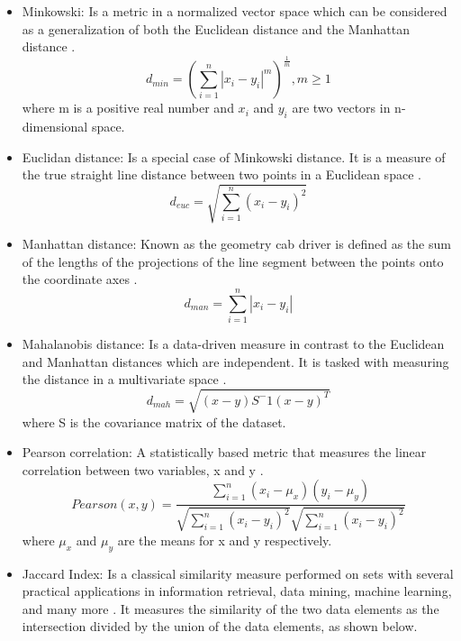 \begin{itemize}
  \item Minkowski: Is a metric in a normalized vector space which can be considered as a generalization of both the Euclidean distance and the Manhattan distance \citep{b56}.
    \begin{equation}
        d_{min} = (\sum_{i=1}^{n}|x_i - y_i|^m)^\frac{1}{m}, m\geq 1
    \end{equation}
    where m is a positive real number and $x_i$ and $y_i$ are two vectors in n-dimensional space.
    \item Euclidan distance: Is a special case of Minkowski distance. It is a measure of the true straight line distance between two points in a Euclidean space \citep{b19}.
    \begin{equation}
        d_{euc} =  \sqrt{\sum_{i=1}^{n}(x_{i}-y_{i})^2}
    \end{equation}
     \item Manhattan distance: Known as the geometry cab driver is defined as the
sum of the lengths of the projections of the line segment between the points onto the coordinate axes \citep{b58}.
     \begin{equation}
        d_{man} =  \sum_{i=1}^{n}|x_{i}-y_{i}|
    \end{equation}
    \item Mahalanobis distance: Is a data-driven measure in contrast to the Euclidean and Manhattan distances which are independent. It is tasked with measuring the distance in a multivariate space \citep{b58}.
    \begin{equation}
        d_{mah}= \sqrt{(x-y)S^-1(x-y)^T}
    \end{equation}
    where S is the covariance matrix of the dataset.
    \item Pearson correlation: A statistically based metric that measures the linear correlation between two variables, x and y \citep{b61}.
    \begin{equation}
        Pearson(x,y)= \frac{\sum_{i=1}^n(x_i-\mu_x)(y_i-\mu_y)}{\sqrt{\sum_{i=1}^n(x_i-y_i)^2}\sqrt{\sum_{i=1}^n(x_i-y_i)^2}}
    \end{equation}
    where $\mu_x$ and $\mu_y$ are the means for x and y respectively.
    \item Jaccard Index: Is a classical similarity measure performed on sets with several practical applications in information retrieval, data mining, machine learning, and many more \citep{b35} \citep{b59}. It measures the similarity of the two data elements as the intersection divided by the union of the data elements, as shown below.

\end{itemize}

